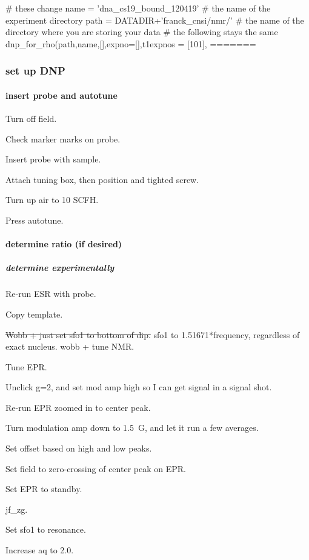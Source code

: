 \begin{scriptsize}
\begin{python}[off]
# these change
name = 'dna_cs19_bound_120419' # the name of the experiment directory
path = DATADIR+'franck_cnsi/nmr/' # the name of the directory where you are storing your data
# the following stays the same
dnp_for_rho(path,name,[],expno=[],t1expnos = [101],
=======
\subsubsection{set up DNP}

\paragraph{insert probe and autotune}

Turn off field.

Check marker marks on probe.

Insert probe with sample.

Attach tuning box, then position and tighted screw.

Turn up air to 10 SCFH.

Press autotune.

\paragraph{determine ratio (if desired)}

\subparagraph{determine experimentally}
Re-run ESR with probe.

Copy template.

\sout{ Wobb + just set sfo1 to bottom of dip. }
sfo1 to 1.51671*frequency, regardless of exact nucleus.
wobb + tune NMR.

Tune EPR.

Unclick g=2, and set mod amp high so I can get signal in a signal shot.

Re-run EPR zoomed in to center peak.

Turn modulation amp down to 1.5~G, and let it run a few averages.

Set offset based on high and low peaks.

Set field to zero-crossing of center peak on EPR.

Set EPR to standby.

jf\_zg.

Set sfo1 to resonance.

Increase aq to 2.0.  


\end{python}
\end{scriptsize}
